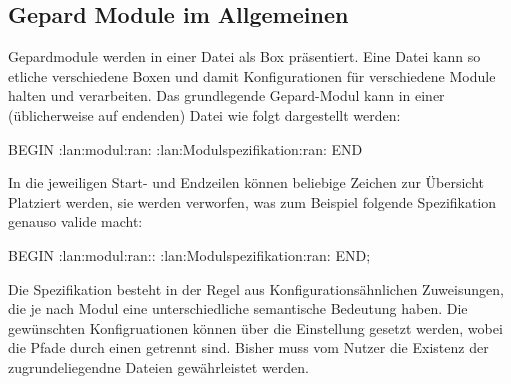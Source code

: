 \subsection{Gepard Module im Allgemeinen}
Gepardmodule werden in einer Datei als Box präsentiert. Eine Datei kann so etliche verschiedene Boxen und damit Konfigurationen für verschiedene Module halten und verarbeiten. Das grundlegende Gepard-Modul kann in einer (üblicherweise auf  endenden) Datei wie folgt dargestellt werden:
\begin{gepard}
BEGIN :lan:modul:ran:
    :lan:Modulspezifikation:ran:
END
\end{gepard}
In die jeweiligen Start- und Endzeilen können beliebige Zeichen zur Übersicht Platziert werden, sie werden verworfen, was zum Beispiel folgende Spezifikation genauso valide macht:
\begin{gepard}
BEGIN :lan:modul:ran::
    :lan:Modulspezifikation:ran:
END;
\end{gepard}
Die Spezifikation besteht in der Regel aus Konfigurationsähnlichen Zuweisungen, die je nach Modul eine unterschiedliche semantische Bedeutung haben. Die gewünschten Konfigruationen können über die Einstellung  %
gesetzt werden, wobei die Pfade durch einen \say{\T{:}} getrennt sind. Bisher muss vom Nutzer die Existenz der zugrundeliegendne Dateien gewährleistet werden.


